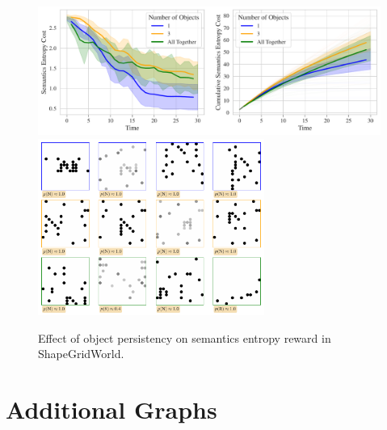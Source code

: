 \begin{figure}[h]
    \centering
    \includegraphics[width=\textwidth]{images/object_persistency_comparison_sgw.pdf}
    \vspace{12pt}
    \includegraphics[width=0.66\textwidth]{images/object_persistency_samples_sgw.pdf}
    \caption{Effect of object persistency on semantics entropy reward in ShapeGridWorld.}
    \label{fig:object-persistency-sgw}
\end{figure}


\chapter{Additional Graphs}
\label{sec:additional-graphs}

